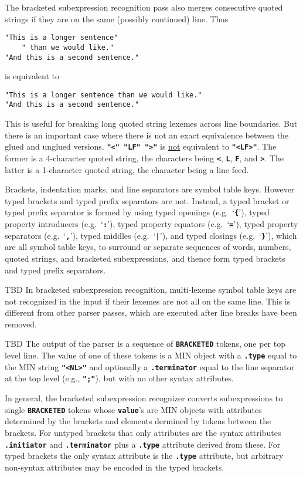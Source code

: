 \documentclass[12pt]{article}
\newcommand{\TT}[1]{{\tt \bfseries #1}}
\newenvironment{indpar}[1][0.3in]%
	{\begin{list}{}%
		     {\setlength{\itemsep}{0in}%
		      \setlength{\topsep}{0in}%
		      \setlength{\parsep}{1ex}%
		      \setlength{\labelwidth}{#1}%
		      \setlength{\leftmargin}{#1}%
		      \addtolength{\leftmargin}{\labelsep}}%
	 \item}%
	{\end{list}}
\begin{document}
The bracketed subexpression recognition pass also merges
consecutive quoted strings if they are on the same
(possibly continued) line.  Thus
\begin{indpar}\begin{verbatim}
"This is a longer sentence"
    " than we would like."
"And this is a second sentence."
\end{verbatim}\end{indpar}
is equivalent to
\begin{indpar}\begin{verbatim}
"This is a longer sentence than we would like."
"And this is a second sentence."
\end{verbatim}\end{indpar}
This is useful for
breaking long quoted string lexemes across line boundaries.
But there is an important case where there is not an exact equivalence
between the glued and unglued versions.  \TT{"<" "LF" ">"} is
\underline{not} equivalent to \TT{"<LF>"}.  The former is a 4-character
quoted string, the characters being \TT{<}, \TT{L}, \TT{F},
and \TT{>}.  The latter is a 1-character quoted string, the character
being a line feed.

Brackets, indentation marks, and line separators are
symbol table keys.  However typed brackets and typed prefix separators are
not.  Instead, a typed bracket or typed prefix separator is formed by using
typed openings (e.g.~`\TT{\{}'),
typed property introducers (e.g.~`\TT{:}'),
typed property equators (e.g.~`\TT{=}'),
typed property separators (e.g.~`\TT{,}'),
typed middles (e.g.~`\TT{|}'),
and typed closings (e.g.~`\TT{\}}'), which are all symbol table
keys, to surround or separate
sequences of words, numbers, quoted strings, and
bracketed subexpressions, and thence form typed brackets
and typed prefix separators.

TBD
In bracketed subexpression recognition, 
multi-lexeme symbol table keys are not recognized in the
input if their lexemes are not all on the same line.
This is different from other parser passes, which are executed
after line breaks have been removed.

TBD
The output of the parser is a sequence of \TT{BRACKETED} tokens,
one per top level line.  The value of one of these tokens is a
MIN object with a \TT{.type} equal to the MIN string
\TT{"<NL>"} and optionally a \TT{.terminator} equal
to the line separator at the top level (e.g., \TT{";"}),
but with no other syntax attributes.

In general, the bracketed subexpression recognizer converts
subexpressions to single \TT{BRACK\-ET\-ED} tokens whose \TT{value}'s
are MIN objects with attributes determined by the brackets
and elements dermined by tokens between the brackets.
For untyped brackets that only
attributes are the syntax attributes \TT{.initiator} and \TT{.terminator}
plus a \TT{.type} attribute derived from these.  For typed brackets
the only syntax attribute is the \TT{.type} attribute, but arbitrary
non-syntax attributes may be encoded in the typed brackets.
\end{document}

